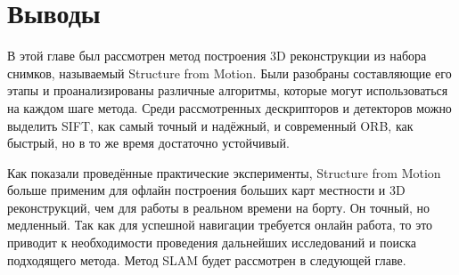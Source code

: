 \section{Выводы}

В этой главе был рассмотрен метод построения 3D реконструкции из набора снимков, называемый Structure from Motion. Были разобраны составляющие его этапы и проанализированы различные алгоритмы, которые могут использоваться на каждом шаге метода. Среди рассмотренных дескрипторов и детекторов можно выделить SIFT, как самый точный и надёжный, и современный ORB, как быстрый, но в то же время достаточно устойчивый.

Как показали проведённые практические эксперименты, Structure from Motion больше применим для офлайн построения больших карт местности и 3D реконструкций, чем для работы в реальном времени на борту. Он точный, но медленный. Так как для успешной навигации требуется онлайн работа, то это приводит к необходимости проведения дальнейших исследований и поиска подходящего метода. Метод SLAM будет рассмотрен в следующей главе.